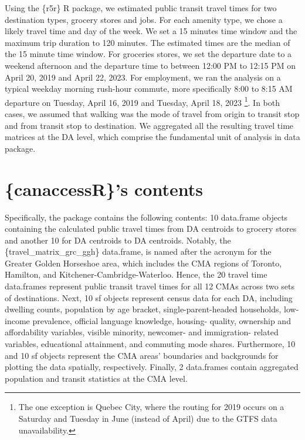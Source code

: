 \documentclass[Royal,times,sageh]{sagej}
\begin{document}
Using the \{r5r\} R package, we estimated public transit travel times
for two destination types, grocery stores and jobs. For each amenity
type, we chose a likely travel time and day of the week. We set a 15
minutes time window and the maximum trip duration to 120 minutes. The
estimated times are the median of the 15 minute time window. For
groceries stores, we set the departure date to a weekend afternoon and
the departure time to between 12:00 PM to 12:15 PM on April 20, 2019 and
April 22, 2023. For employment, we ran the analysis on a typical weekday
morning rush-hour commute, more specifically 8:00 to 8:15 AM departure
on Tuesday, April 16, 2019 and Tuesday, April 18, 2023 \footnote{The one
  exception is Quebec City, where the routing for 2019 occurs on a
  Saturday and Tuesday in June (instead of April) due to the GTFS data
  unavailability.}. In both cases, we assumed that walking was the mode
of travel from origin to transit stop and from transit stop to
destination. We aggregated all the resulting travel time matrices at the
DA level, which comprise the fundamental unit of analysis in data
package.

\section{\{canaccessR\}'s contents}\label{canaccessrs-contents}

Specifically, the package contains the following contents: 10 data.frame
objects containing the calculated public travel times from DA centroids
to grocery stores and another 10 for DA centroids to DA centroids.
Notably, the \{travel\_matrix\_grc\_ggh\} data.frame, is named after the
acronym for the Greater Golden Horseshoe area, which includes the CMA
regions of Toronto, Hamilton, and Kitchener-Cambridge-Waterloo. Hence,
the 20 travel time data.frames represent public transit travel times for
all 12 CMAs across two sets of destinations. Next, 10 sf objects
represent census data for each DA, including dwelling counts, population
by age bracket, single-parent-headed households, low-income prevalence,
official language knowledge, housing- quality, ownership and
affordability variables, visible minority, newcomer- and immigration-
related variables, educational attainment, and commuting mode shares.
Furthermore, 10 and 10 sf objects represent the CMA areas' boundaries
and backgrounds for plotting the data spatially, respectively. Finally,
2 data.frames contain aggregated population and transit statistics at
the CMA level.
\end{document}
